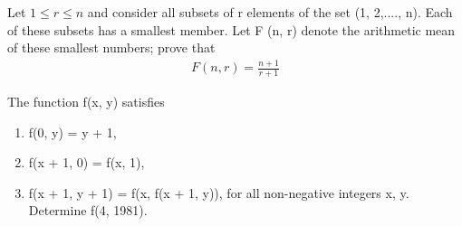 \item Let $1 \leq r \leq n$ and consider all subsets of r elements of the set (1, 2,...., n). Each of these subsets has a smallest member. Let F (n, r) denote the arithmetic mean of these smallest numbers; prove that
\begin{align*}
F (n, r) = \frac{n + 1}{r + 1}
\end{align*}

\item The function f(x, y) satisfies
\begin{enumerate}
\item f(0, y) = y + 1,
\item f(x + 1, 0) = f(x, 1),
\item f(x + 1, y + 1) = f(x, f(x + 1, y)),
for all non-negative integers x, y. Determine f(4, 1981).
\end{enumerate}

